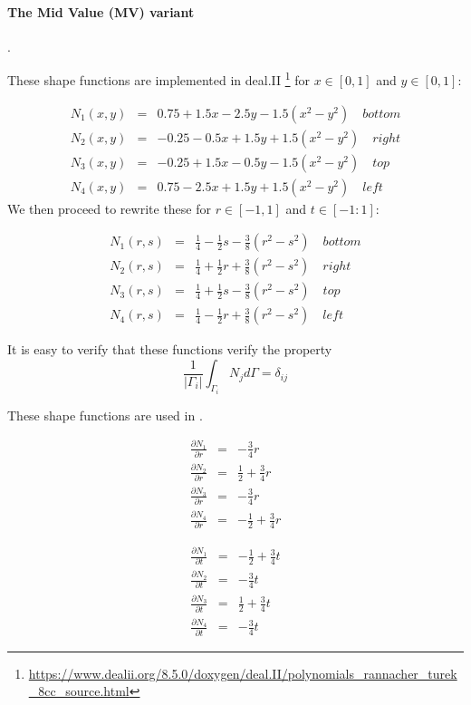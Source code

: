 \paragraph{The Mid Value (MV) variant}. 

These shape functions are implemented in deal.II
\footnote{\url{https://www.dealii.org/8.5.0/doxygen/deal.II/polynomials_rannacher_turek_8cc_source.html}}
for $x\in[0,1]$ and $y\in[0,1]$:

\begin{eqnarray}
N_1(x,y) &=&  0.75 + 1.5x - 2.5y -1.5(x^2-y^2) \quad bottom\\
N_2(x,y) &=& -0.25 - 0.5x + 1.5y +1.5(x^2-y^2) \quad right\\
N_3(x,y) &=& -0.25 + 1.5x - 0.5y -1.5(x^2-y^2) \quad top\\
N_4(x,y) &=&  0.75 - 2.5x + 1.5y +1.5(x^2-y^2) \quad left
\end{eqnarray}
We then proceed to rewrite these for $r\in[-1,1]$ and $t\in[-1:1]$:
\begin{mdframed}[backgroundcolor=blue!5]
\begin{eqnarray}
N_1(r,s) &=& \frac{1}{4} -\frac{1}{2}s - \frac{3}{8}(r^2-s^2) \quad bottom \\
N_2(r,s) &=& \frac{1}{4} +\frac{1}{2}r + \frac{3}{8}(r^2-s^2) \quad right \\
N_3(r,s) &=& \frac{1}{4} +\frac{1}{2}s - \frac{3}{8}(r^2-s^2) \quad top \\
N_4(r,s) &=& \frac{1}{4} -\frac{1}{2}r + \frac{3}{8}(r^2-s^2) \quad left
\end{eqnarray}
\end{mdframed}
It is easy to verify that these functions verify the property
\[
\frac{1}{|\Gamma_i|} \int_{\Gamma_i} N_j d\Gamma = \delta_{ij}
\]

These shape functions are used in \cite{shzh06}.

\begin{eqnarray}
\frac{\partial N_1}{\partial r} &=& -\frac{3}{4}r \nonumber\\
\frac{\partial N_2}{\partial r} &=& \frac{1}{2}+\frac{3}{4}r \nonumber\\
\frac{\partial N_3}{\partial r} &=& -\frac{3}{4}r \nonumber\\
\frac{\partial N_4}{\partial r} &=& -\frac{1}{2}+\frac{3}{4}r \nonumber
\end{eqnarray}

\begin{eqnarray}
\frac{\partial N_1}{\partial t} &=& -\frac{1}{2}+\frac{3}{4}t \nonumber\\
\frac{\partial N_2}{\partial t} &=& -\frac{3}{4}t \nonumber\\
\frac{\partial N_3}{\partial t} &=& \frac{1}{2}+\frac{3}{4}t \nonumber\\
\frac{\partial N_4}{\partial t} &=& -\frac{3}{4}t \nonumber
\end{eqnarray}













